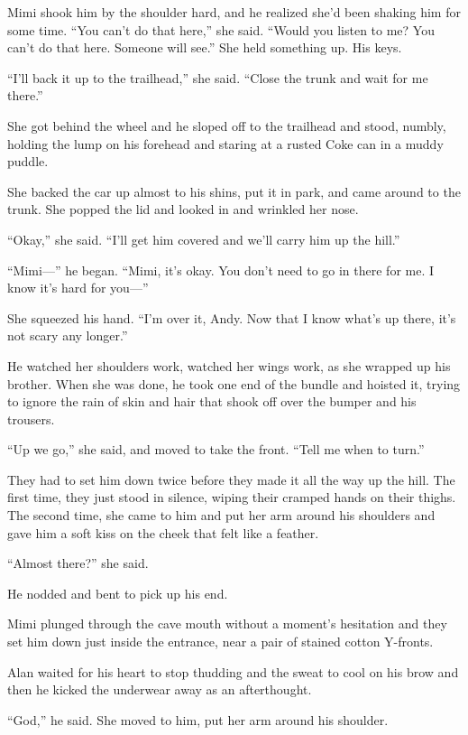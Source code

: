 \documentclass{article}
\begin{document}
Mimi shook him by the shoulder hard, and he realized she'd been
shaking him for some time.  ``You can't do that here,'' she said. 
``Would you listen to me?  You can't do that here.  Someone will
see.'' She held something up.  His keys.

``I'll back it up to the trailhead,'' she said.  ``Close the trunk and
wait for me there.''

She got behind the wheel and he sloped off to the trailhead and stood,
numbly, holding the lump on his forehead and staring at a rusted Coke
can in a muddy puddle.

She backed the car up almost to his shins, put it in park, and came
around to the trunk.  She popped the lid and looked in and wrinkled
her nose.

``Okay,'' she said.  ``I'll get him covered and we'll carry him up the
hill.''

``Mimi---'' he began.  ``Mimi, it's okay.  You don't need to go in
there for me.  I know it's hard for you---''

She squeezed his hand.  ``I'm over it, Andy.  Now that I know what's
up there, it's not scary any longer.''

He watched her shoulders work, watched her wings work, as she wrapped
up his brother.  When she was done, he took one end of the bundle and
hoisted it, trying to ignore the rain of skin and hair that shook off
over the bumper and his trousers.

``Up we go,'' she said, and moved to take the front.  ``Tell me when
to turn.''

They had to set him down twice before they made it all the way up the
hill.  The first time, they just stood in silence, wiping their
cramped hands on their thighs.  The second time, she came to him and
put her arm around his shoulders and gave him a soft kiss on the cheek
that felt like a feather.

``Almost there?'' she said.

He nodded and bent to pick up his end.

Mimi plunged through the cave mouth without a moment's hesitation and
they set him down just inside the entrance, near a pair of stained
cotton Y-fronts.

Alan waited for his heart to stop thudding and the sweat to cool on
his brow and then he kicked the underwear away as an afterthought.

``God,'' he said.  She moved to him, put her arm around his shoulder.
\end{document}
